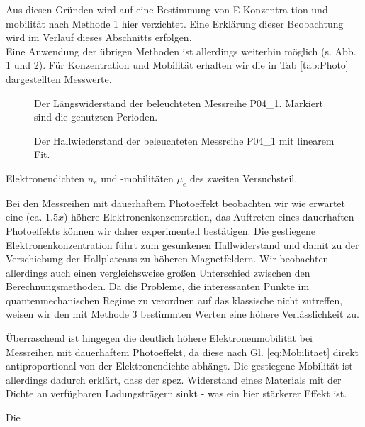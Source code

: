 Aus diesen Gründen wird auf eine Bestimmung von E-Konzentra-tion und -mobilität nach Methode 1 hier verzichtet. Eine Erklärung dieser Beobachtung wird im Verlauf dieses Abschnitts erfolgen. \\

Eine Anwendung der übrigen Methoden ist allerdings weiterhin möglich (s. Abb. \ref{abb:P04_Meth_2} und \ref{abb:P04_Meth_3}).
Für Konzentration und Mobilität erhalten wir die in Tab \ref{tab:Photo} dargestellten Messwerte. \\


\begin{figure}[h!]
	\centering
	
	\caption{Der Längswiderstand der beleuchteten Messreihe P04\_1. Markiert sind die genutzten Perioden.}
	\label{abb:P04_Meth_2}
\end{figure}

\begin{figure}[h!]
	\centering
	
	\caption{Der Hallwiederstand der beleuchteten Messreihe P04\_1 mit linearem Fit.}
	\label{abb:P04_Meth_3}
\end{figure}

\begin{table}[h!]
	\centering
	\caption{Elektronendichten $n_e$ und -mobilitäten $\mu_e$ des zweiten Versuchsteil.}
	
	\label{tab:Photo}
\end{table}
Bei den Messreihen mit dauerhaftem Photoeffekt beobachten wir wie erwartet eine (ca. $1.5x$) höhere Elektronenkonzentration, das Auftreten eines dauerhaften Photoeffekts können wir daher experimentell bestätigen. Die gestiegene Elektronenkonzentration führt zum gesunkenen Hallwiderstand und damit zu der Verschiebung der Hallplateaus zu höheren Magnetfeldern. Wir beobachten allerdings auch einen vergleichsweise großen Unterschied zwischen den Berechnungsmethoden. Da die Probleme, die interessanten Punkte im quantenmechanischen Regime zu verordnen auf das klassische nicht zutreffen, weisen wir den mit Methode 3 bestimmten Werten eine höhere Verlässlichkeit zu. 

Überraschend ist hingegen die deutlich höhere Elektronenmobilität bei Messreihen mit dauerhaftem Photoeffekt, da diese nach Gl. \ref{eq:Mobilitaet} direkt antiproportional von der Elektronendichte abhängt. Die gestiegene Mobilität ist allerdings dadurch erklärt, dass der spez. Widerstand eines Materials mit der Dichte an verfügbaren Ladungsträgern sinkt - was ein hier stärkerer Effekt ist.

Die 
